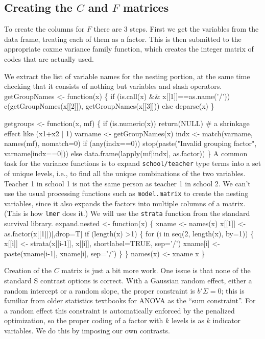 \documentclass{article}
\begin{document}
\subsection{Creating the $C$ and $F$ matrices}
To create the columns for $F$ there are 3 steps.
First we get the variables from the data frame, treating each of them
as a factor.  This is then submitted to the
appropriate coxme variance family function, which
creates the integer matrix of codes that are actually used.

We extract the list of variable names for the nesting portion,
at the same time checking that it consists of nothing but variables
and slash operators.
\nwenddocs{}\endmoddef
getGroupNames <- function(x) \{
    if (is.call(x) && x[[1]]==as.name('/')) 
        c(getGroupNames(x[[2]]), getGroupNames(x[[3]]))
    else deparse(x)
    \}

getgroups <- function(x, mf) \{
    if (is.numeric(x)) return(NULL)  # a shrinkage effect like (x1+x2 | 1)
    varname <- getGroupNames(x)
    indx <- match(varname, names(mf), nomatch=0)
    if (any(indx==0)) stop(paste("Invalid grouping factor", varname[indx==0]))
    else data.frame(lapply(mf[indx], as.factor))
    \}
\nwendcode{}\nwdocspar
A common task for the variance functions is to expand {\tt{}school/teacher}
type terms into a set of unique levels, i.e., to find all the unique
combinations of the two variables.  Teacher 1 in school 1 is not the same
person as teacher 1 in school 2.
We can't use the usual processing functions such as {\tt{}model.matrix}  %
to create the nesting variables, since it also expands the factors
into multiple columns of a matrix.  (This is how {\tt{}lmer} does it.)
We will use the {\tt{}strata} function from the standard survival library.
\nwenddocs{}\endmoddef
expand.nested <- function(x) \{
    xname <- names(x)
    x[[1]] <- as.factor(x[[1]])[,drop=T]
    if (length(x) >1) \{
        for (i in seq(2, length(x), by=1)) \{
            x[[i]] <- strata(x[[i-1]], x[[i]], shortlabel=TRUE, sep='/')
            xname[i] <- paste(xname[i-1], xname[i], sep='/')
            \}
       \} 
    names(x) <- xname
    x
    \}
\nwendcode{}    

Creation of the $C$ matrix is just a bit more work.  
One issue is that none of the standard S contrast options is correct.
With a Gaussian random effect, either a random intercept or a random slope,  
the proper constraint is $b' \Sigma =0$;       %
this is familiar from older statistics textbooks for ANOVA as the ``sum 
constraint''. 
For a random effect this constraint is automatically enforced by the 
penalized optimization, so the proper coding of a factor with $k$ levels
is as $k$ indicator variables.
We do this by imposing our own contrasts. 
\end{document}

